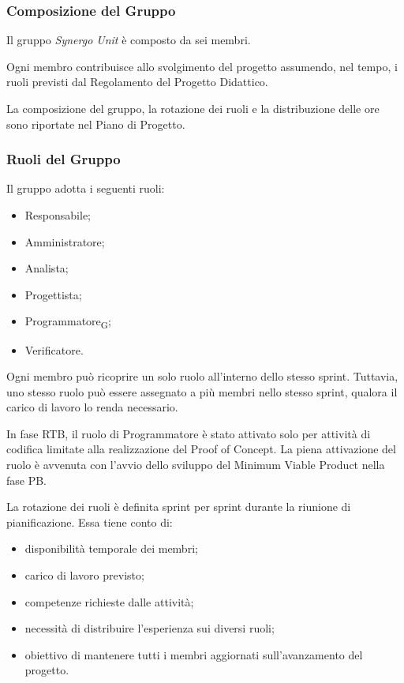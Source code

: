 
\subsubsection{Composizione del Gruppo}

Il gruppo \textit{Synergo Unit} è composto da sei membri.

Ogni membro contribuisce allo svolgimento del progetto assumendo, nel tempo, i
ruoli previsti dal Regolamento del Progetto Didattico.

La composizione del gruppo, la rotazione dei ruoli e la distribuzione delle ore
sono riportate nel Piano di Progetto.


\subsubsection{Ruoli del Gruppo}
\label{sec:ruoli}

Il gruppo adotta i seguenti ruoli:

\begin{itemize}
    \item Responsabile;
    \item Amministratore;
    \item Analista;
    \item Progettista;
    \item Programmatore\textsubscript{G};
    \item Verificatore.
\end{itemize}

Ogni membro può ricoprire un solo ruolo all'interno dello stesso sprint. Tuttavia,
uno stesso ruolo può essere assegnato a più membri nello stesso sprint, qualora il
carico di lavoro lo renda necessario.

In fase RTB, il ruolo di Programmatore è stato attivato solo per attività di codifica
limitate alla realizzazione del Proof of Concept. La piena attivazione del ruolo è avvenuta
con l'avvio dello sviluppo del Minimum Viable Product nella fase PB.

La rotazione dei ruoli è definita sprint per sprint durante la riunione di
pianificazione. Essa tiene conto di:

\begin{itemize}
    \item disponibilità temporale dei membri;
    \item carico di lavoro previsto;
    \item competenze richieste dalle attività;
    \item necessità di distribuire l'esperienza sui diversi ruoli;
    \item obiettivo di mantenere tutti i membri aggiornati sull'avanzamento del progetto.
\end{itemize}

